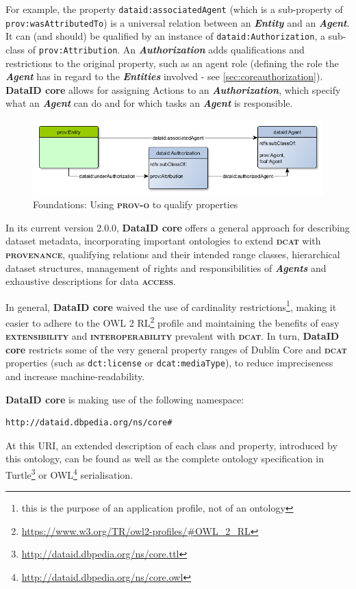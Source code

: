 \documentclass[a4paper,english,twoside,BCOR1.5cm,headsepline,DIV12,appendixprefix,final,12pt]{scrbook}
\newcommand{\provenance}{{\ttfamily\scshape\bfseries provenance}\xspace}
\newcommand{\access}{{\ttfamily\scshape\bfseries access}\xspace}
\newcommand{\extensibility}{{\ttfamily\scshape\bfseries extensibility}\xspace}
\newcommand{\interoperability}{{\ttfamily\scshape\bfseries interoperability}\xspace}
\newcommand{\core}{{\ttfamily\bfseries DataID core}\xspace}
\newcommand{\prov}{{\scshape\bfseries prov-o}\xspace}
\newcommand{\dcat}{{\scshape\bfseries dcat}\xspace}
\newcommand{\prop}[1]{{{\texttt{#1}}}}
\newcommand{\important}[1]{\textbf{\textit{#1}}}
\newcommand\footnoteurl[1]{\footnote{\scriptsize\url{#1}}}
\begin{document}
For example, the property \prop{dataid:associatedAgent} (which is a sub-property of \prop{prov:wasAttributedTo}) is a universal relation between an \important{Entity} and an \important{Agent}. It can (and should) be qualified by an instance of \prop{dataid:Authorization}, a sub-class of \prop{prov:Attribution}. An \important{Authorization} adds qualifications and restrictions to the original property, such as an agent role (defining the role the \important{Agent} has in regard to the \important{Entities} involved - see \cref{sec:coreauthorization}). \core allows for assigning Actions to an \important{Authorization}, which specify what an \important{Agent} can do and for which tasks an \important{Agent} is responsible.

\begin{figure}[!htbp]
\centering
  \includegraphics[width=\textwidth]{images/FoundationalConseptProv.png}
  \caption{Foundations: Using \prov to qualify properties}
  \label{fig:foundations}
\end{figure}

In its current version 2.0.0, \core offers a general approach for describing dataset metadata, incorporating important ontologies to extend \dcat with \provenance, qualifying relations and their intended range classes, hierarchical dataset structures, management of rights and responsibilities of \important{Agents} and exhaustive descriptions for data \access. 

In general, \core waived the use of cardinality restrictions\footnote{this is the purpose of an application profile, not of an ontology}, making it easier to adhere to the OWL 2 RL\footnoteurl{https://www.w3.org/TR/owl2-profiles/#OWL_2_RL} profile and maintaining the benefits of easy \extensibility and \interoperability prevalent with \dcat. In turn, \core restricts some of the very general property ranges of Dublin Core and \dcat properties (such as \prop{dct:license} or \prop{dcat:mediaType}), to reduce impreciseness and increase machine-readability.

\core is making use of the following namespace:
\begin{lstlisting}[language=ttl, label=lst:graph,linewidth=\columnwidth,breaklines=true,basicstyle=\ttfamily\footnotesize]
http://dataid.dbpedia.org/ns/core#
\end{lstlisting}
At this URI, an extended description of each class and property, introduced by this ontology, can be found as well as the complete ontology specification in Turtle\footnoteurl{http://dataid.dbpedia.org/ns/core.ttl} or OWL\footnoteurl{http://dataid.dbpedia.org/ns/core.owl} serialisation.
\end{document}
